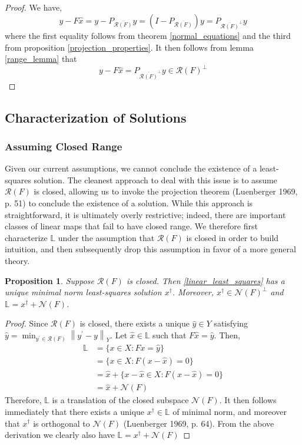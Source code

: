 \documentclass[12pt]{article}
\newcommand*{\norm}[1]{\left\lVert#1\right\rVert}
\newcommand{\R}{\mathcal{R}}
\newcommand{\N}{\mathcal{N}}
\newtheorem{prop}{Proposition}
\begin{document}
\begin{proof} 
We have, \[y - F\hat{x} = y - P_{\overline{\R(F)}}y = (I - P_{\overline{\R(F)}})y = P_{\overline{\R(F)}^\perp}y\]
where the first equality follows from theorem \ref{normal_equations} and the third from proposition \ref{projection_properties}. 
It then follows from lemma \ref{range_lemma} that \[y - F\hat{x} = P_{\overline{\R(F)}^\perp}y \in \R(F)^\perp\]
\end{proof} 

\subsection{Characterization of Solutions}

\subsubsection{Assuming Closed Range}

Given our current assumptions, we cannot conclude the existence of a least-squares solution. The cleanest approach to deal with this 
issue is to assume $\R(F)$ is closed, allowing us to invoke the projection theorem (Luenberger 1969, p. 51) to conclude the existence of a solution. While this 
approach is straightforward, it is ultimately overly restrictive; indeed, there are important classes of linear maps that fail to have closed 
range. We therefore first characterize $\mathbb{L}$ under the assumption that $\R(F)$ is closed in order to build intuition, and then 
subsequently drop this assumption in favor of a more general theory. 
 
 \begin{prop}
 Suppose $\R(F)$ is closed. Then \eqref{linear_least_squares} has a unique minimal norm least-squares solution $x^\dagger$. Moreover, 
 $x^\dagger \in \N(F)^\perp$ and  $\mathbb{L} = x^\dagger + \N(F)$.
 \end{prop} 
 
\begin{proof} 
Since $\R(F)$ is closed, there exists a unique $\hat{y} \in Y$ satisfying $\hat{y} = \min_{y^\prime \in \R(F)} \norm{y^\prime - y}_{Y}$. Let $\hat{x} \in \mathbb{L}$ such that $F\hat{x} = \hat{y}$. Then, 
 \begin{align*} 
 \mathbb{L} &= \{x \in X: Fx = \hat{y}\} \\
                   &= \{x \in X: F(x - \hat{x}) = 0\} \\
                   &= \hat{x} + \{x - \hat{x} \in X: F(x - \hat{x}) = 0\} \\
                   &= \hat{x} + \N(F)
 \end{align*} 
 Therefore, $ \mathbb{L}$ is a translation of the closed subspace $\N(F)$. It then follows immediately that there exists a unique $x^\dagger \in \mathbb{L}$ of minimal norm, and moreover that $x^\dagger$ is orthogonal to $\N(F)$ (Luenberger 1969, p. 64). From the above derivation we clearly also have $\mathbb{L} = x^\dagger + \N(F)$
\end{proof} 
\end{document}
